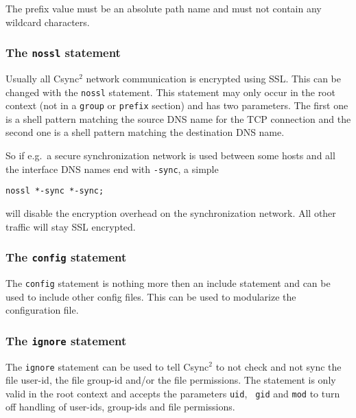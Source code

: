 \documentclass[a4paper,twocolumn]{article}
\def\csync2{{\sc Csync$^{2}$}}
\begin{document}
The prefix value must be an absolute path name and must not contain any
wildcard characters.

\subsubsection{The {\tt nossl} statement}

Usually all \csync2 network communication is encrypted using SSL. This can be
changed with the {\tt nossl} statement. This statement may only occur in the
root context (not in a {\tt group} or {\tt prefix} section) and has two
parameters. The first one is a shell pattern matching the source DNS name for
the TCP connection and the second one is a shell pattern matching the
destination DNS name.

So if e.g.~a secure synchronization network is used between some hosts and
all the interface DNS names end with {\tt -sync}, a simple

\begin{verbatim}
nossl *-sync *-sync;
\end{verbatim}

will disable the encryption overhead on the synchronization network. All other
traffic will stay SSL encrypted.

\subsubsection{The {\tt config} statement}

The {\tt config} statement is nothing more then an include statement and can be
used to include other config files. This can be used to modularize the
configuration file.

\subsubsection{The {\tt ignore} statement}

The {\tt ignore} statement can be used to tell \csync2 to not check and not sync
the file user-id, the file group-id and/or the file permissions. The statement
is only valid in the root context and accepts the parameters {\tt uid}, {\tt
gid} and {\tt mod} to turn off handling of user-ids, group-ids and file
permissions.

\end{document}
